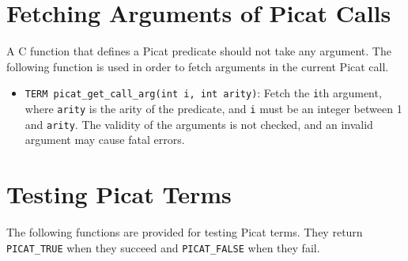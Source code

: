 \section{Fetching Arguments of Picat Calls} 
A C function that defines a Picat predicate should not take any argument. The following function is used in order to fetch arguments in the current Picat call.
\begin{itemize}
\item \texttt{TERM picat\_get\_call\_arg(int i, int arity)}: Fetch the \texttt{i}th argument, where \texttt{arity} is the arity of the predicate, and \texttt{i} must be an integer between 1 and \texttt{arity}. The validity of the arguments is not checked, and an invalid argument may cause fatal errors.
\end{itemize}

\section{Testing Picat Terms} 
The following functions are provided for testing Picat terms. They return \texttt{PICAT\_TRUE} when they succeed and \texttt{PICAT\_FALSE} when they fail.
